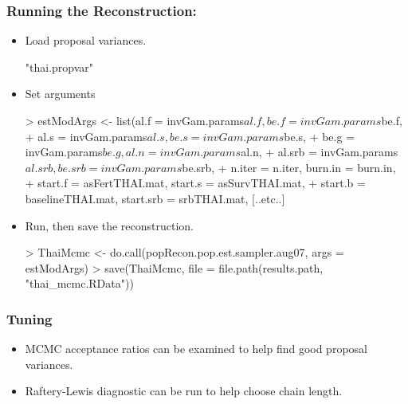 \documentclass[smaller,compress,table]{beamer}
\begin{document}
\begin{frame}[fragile]
  \frametitle{Running the Reconstruction: }
  \begin{itemize}
  \item Load proposal variances.


\begin{Schunk}
\begin{Soutput}
[1] "thai.propvar"
\end{Soutput}
\end{Schunk}


\item Set arguments
\begin{Schunk}
\begin{Sinput}
> estModArgs <- list(al.f = invGam.params$al.f, be.f = invGam.params$be.f,
+     al.s = invGam.params$al.s, be.s = invGam.params$be.s,
+     be.g = invGam.params$be.g, al.n = invGam.params$al.n,
+     al.srb = invGam.params$al.srb, be.srb = invGam.params$be.srb,
+     n.iter = n.iter, burn.in = burn.in,
+     start.f = asFertTHAI.mat, start.s = asSurvTHAI.mat,
+     start.b = baselineTHAI.mat, start.srb = srbTHAI.mat,
[..etc..]
\end{Sinput}
\end{Schunk}
  \item Run, then save the reconstruction.
\begin{Schunk}
  \begin{Sinput}
> ThaiMcmc <- do.call(popRecon.pop.est.sampler.aug07, args = estModArgs)
> save(ThaiMcmc, file = file.path(results.path, "thai_mcmc.RData"))
  \end{Sinput}
\end{Schunk}
  \end{itemize}
\end{frame}


\begin{frame}
  \frametitle{Tuning }
  \begin{itemize}
  \item MCMC acceptance ratios can be examined to help find good proposal variances.
  \item Raftery-Lewis diagnostic can be run to help choose chain length.
  \end{itemize}
\end{frame}
\end{document}
